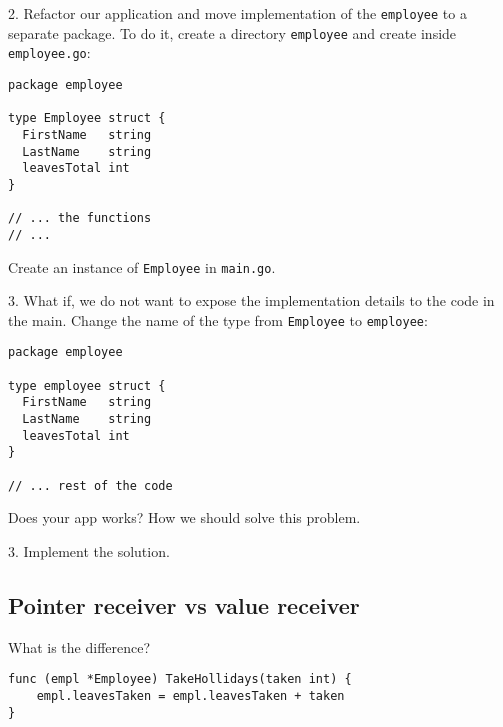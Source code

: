 \documentclass[11pt, letterpaper]{article}
\begin{document}



\bigskip

2. Refactor our application and move implementation of the \verb|employee| to a separate package. To do it, create a directory \verb|employee| and create inside \verb|employee.go|:

\begin{verbatim}
package employee

type Employee struct {
  FirstName   string
  LastName    string
  leavesTotal int
}

// ... the functions
// ...

\end{verbatim}

Create an instance of \verb|Employee| in \verb|main.go|.

\bigskip

3. What if, we do not want to expose the implementation details to the code in the main. Change the name of the type from \verb|Employee| to \verb|employee|:

\begin{verbatim}
package employee

type employee struct {
  FirstName   string
  LastName    string
  leavesTotal int
}

// ... rest of the code
\end{verbatim}

Does your app works? How we should solve this problem.

\bigskip

3. Implement the solution.



\subsection{Pointer receiver vs value receiver}

What is the difference?

\begin{verbatim}
func (empl *Employee) TakeHollidays(taken int) {
    empl.leavesTaken = empl.leavesTaken + taken
}
\end{verbatim}
\end{document}
